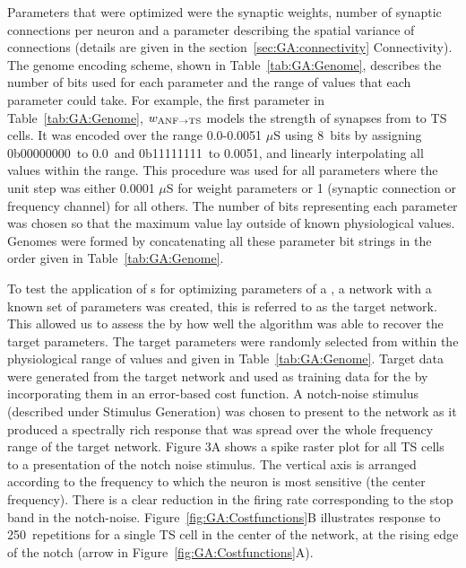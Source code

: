 \smallskip{} 

Parameters that were optimized were the synaptic weights, number of
synaptic connections per neuron and a parameter describing the spatial
variance of connections (details are given in the
section~\ref{sec:GA:connectivity} Connectivity). The genome encoding
scheme, shown in Table~\ref{tab:GA:Genome}, describes the number of bits
used for each parameter and the range of values that each parameter
could take.  For example, the first parameter in Table~\ref{tab:GA:Genome},
$w_{{\rm ANF}\to{\rm TS}}$ models the strength of synapses from {\ANF} to
TS cells. It was encoded over the range 0.0-0.0051 $\mu$S using 8~bits
by assigning 0b00000000~to 0.0~and 0b11111111~to 0.0051, and linearly
interpolating all values within the range. This procedure was used for
all parameters where the unit step was either 0.0001 $\mu$S for weight
parameters or 1 (synaptic connection or frequency channel) for all
others. The number of bits representing each parameter was chosen so
that the maximum value lay outside of known physiological
values. Genomes were formed by concatenating all these parameter bit
strings in the order given in Table~\ref{tab:GA:Genome}.

\smallskip{}

To test the application of {\GA}s for optimizing parameters of a {\BNN}, a
network with a known set of parameters was created, this is referred
to as the target network.  This allowed us to assess the {\GA} by how
well the algorithm was able to recover the target parameters. The
target parameters were randomly selected from within the physiological
range of values and given in Table~\ref{tab:GA:Genome}.  Target data
were generated from the target network and used as training data for
the {\GA} by incorporating them in an error-based cost function.  A
notch-noise stimulus (described under Stimulus Generation) was chosen
to present to the network as it produced a spectrally rich response
that was spread over the whole frequency range of the target network.
Figure 3A shows a spike raster plot for all TS cells to a presentation
of the notch noise stimulus. The vertical axis is arranged according
to the frequency to which the neuron is most sensitive (the center
frequency). There is a clear reduction in the firing rate
corresponding to the stop band in the
notch-noise. Figure~\ref{fig:GA:Costfunctions}B illustrates response
to 250~repetitions for a single TS cell in the center of the network,
at the rising edge of the notch (arrow in
Figure~\ref{fig:GA:Costfunctions}A).

